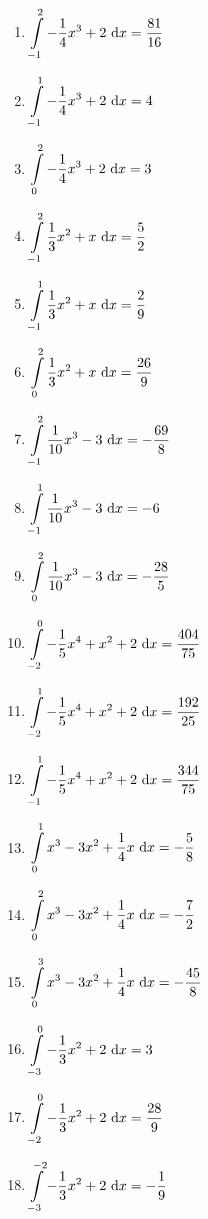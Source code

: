 \begin{Answer}[ref=integralRechnA1]
	\begin{enumerate}[label=\alph*)]
		\item \(\displaystyle\int\limits_{-1}^{2} -\frac{1}{4}x^3+2\ \text{d} x= \frac{81}{16}\)
		\item \(\displaystyle\int\limits_{-1}^{1} -\frac{1}{4}x^3+2\ \text{d} x= 4\)
		\item \(\displaystyle\int\limits_{0}^{2} -\frac{1}{4}x^3+2\ \text{d} x= 3\)

		\item \(\displaystyle\int\limits_{-1}^{2} \frac{1}{3}x^2+x\ \text{d} x= \frac{5}{2}\)
		\item \(\displaystyle\int\limits_{-1}^{1} \frac{1}{3}x^2+x\ \text{d} x= \frac{2}{9}\)
		\item \(\displaystyle\int\limits_{0}^{2} \frac{1}{3}x^2+x\ \text{d} x= \frac{26}{9}\)

		\item \(\displaystyle\int\limits_{-1}^{2} \frac{1}{10}x^3-3\ \text{d} x= -\frac{69}{8}\)
		\item \(\displaystyle\int\limits_{-1}^{1} \frac{1}{10}x^3-3\ \text{d} x= -6\)
		\item \(\displaystyle\int\limits_{0}^{2} \frac{1}{10}x^3-3\ \text{d} x= -\frac{28}{5}\)

		\item \(\displaystyle\int\limits_{-2}^{0} -\frac{1}{5}x^4+x^2+2\ \text{d} x= \frac{404}{75}\)
		\item \(\displaystyle\int\limits_{-2}^{1} -\frac{1}{5}x^4+x^2+2\ \text{d} x= \frac{192}{25}\)
		\item \(\displaystyle\int\limits_{-1}^{1} -\frac{1}{5}x^4+x^2+2\ \text{d} x= \frac{344}{75}\)

		\item \(\displaystyle\int\limits_{0}^{1} x^3-3x^2+\frac{1}{4}x\ \text{d} x= -\frac{5}{8}\)
		\item \(\displaystyle\int\limits_{0}^{2} x^3-3x^2+\frac{1}{4}x\ \text{d} x= -\frac{7}{2}\)
		\item \(\displaystyle\int\limits_{0}^{3} x^3-3x^2+\frac{1}{4}x\ \text{d} x= -\frac{45}{8}\)

		\item \(\displaystyle\int\limits_{-3}^{0} -\frac{1}{3}x^2+2\ \text{d} x= 3\)
		\item \(\displaystyle\int\limits_{-2}^{0} -\frac{1}{3}x^2+2\ \text{d} x= \frac{28}{9}\)
		\item \(\displaystyle\int\limits_{-3}^{-2} -\frac{1}{3}x^2+2\ \text{d} x= -\frac{1}{9}\)
	\end{enumerate}
\end{Answer}
